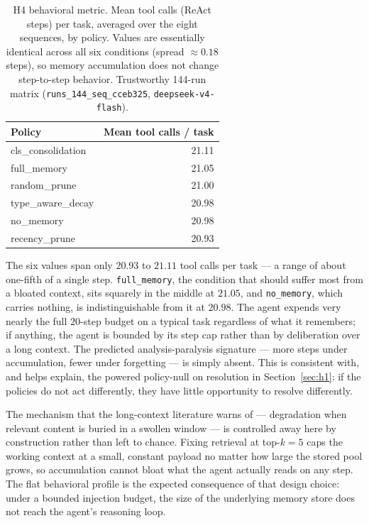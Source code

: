 \begin{table}[htbp]
  \centering
  \caption{H4 behavioral metric. Mean tool calls (ReAct steps) per task, averaged over the
  eight sequences, by policy. Values are essentially identical across all six conditions
  (spread $\approx 0.18$ steps), so memory accumulation does not change step-to-step
  behavior. Trustworthy 144-run matrix (\texttt{runs\_144\_seq\_cceb325},
  \texttt{deepseek-v4-flash}).}
  \label{tab:behavioral}
  \begin{tabular}{lr}
    \toprule
    Policy & Mean tool calls / task \\
    \midrule
    cls\_consolidation & 21.11 \\
    full\_memory       & 21.05 \\
    random\_prune      & 21.00 \\
    type\_aware\_decay & 20.98 \\
    no\_memory         & 20.98 \\
    recency\_prune     & 20.93 \\
    \bottomrule
  \end{tabular}
\end{table}

The six values span only $20.93$ to $21.11$ tool calls per task --- a range of about
one-fifth of a single step. \texttt{full\_memory}, the condition that should suffer most
from a bloated context, sits squarely in the middle at $21.05$, and \texttt{no\_memory},
which carries nothing, is indistinguishable from it at $20.98$. The agent expends very
nearly the full $20$-step budget on a typical task regardless of what it remembers; if
anything, the agent is bounded by its step cap rather than by deliberation over a long
context. The predicted analysis-paralysis signature --- more steps under accumulation,
fewer under forgetting --- is simply absent. This is consistent with, and helps explain,
the powered policy-null on resolution in Section~\ref{sec:h1}: if the policies do not act
differently, they have little opportunity to resolve differently.

The mechanism that the long-context literature warns of --- degradation when relevant
content is buried in a swollen window \cite{liu2024,xiong2025} --- is controlled away here
by construction rather than left to chance. Fixing retrieval at top-$k=5$ caps the working
context at a small, constant payload no matter how large the stored pool grows, so
accumulation cannot bloat what the agent actually reads on any step. The flat behavioral
profile is the expected consequence of that design choice: under a bounded injection
budget, the size of the underlying memory store does not reach the agent's reasoning loop.

